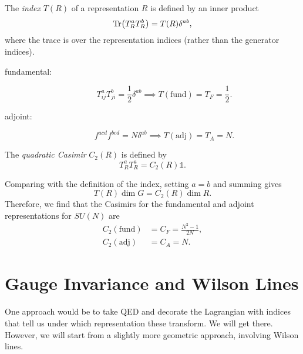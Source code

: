 \begin{definition}[index]
  The \emph{index} $T(R)$ of a representation $R$ is defined by an inner product
  \begin{equation}
    \Tr(T^{a}_R T^{b}_R) = T(R) \delta^{ab},
  \end{equation}
  where the trace is over the representation indices (rather than the generator indices).
\end{definition}
\begin{description}
  \item[fundamental:] 
  \begin{equation}
    T^{a}_{ij} T^{b}_{ji} = \frac{1}{2} \delta^{ab} \implies T(\text{fund}) = T_F = \frac{1}{2}.
  \end{equation}
\item[adjoint:] 
  \begin{equation}
    f^{acd} f^{bcd} = N \delta^{ab} \implies T(\text{adj}) = T_A = N.
  \end{equation}
\end{description}

\begin{definition}
  The \emph{quadratic Casimir} $C_2(R)$ is defined by
  \begin{equation}
    T^{a}_R T^{a}_R = C_2(R) \mathbb{1}.
  \end{equation}
\end{definition}
Comparing with the definition of the index, setting $a = b$ and summing gives
\begin{equation}
  T(R) \dim G = C_2 (R) \dim R.
\end{equation}
Therefore, we find that the Casimirs for the fundamental and adjoint representations for $SU(N)$ are
\begin{align}
  C_2 (\text{fund}) &= C_F = \frac{N^2 - 1}{2N}, \\
  C_2 (\text{adj}) &= C_A = N.
\end{align}

\section{Gauge Invariance and Wilson Lines}%
\label{sec:gauge_invariance_and_wilson_lines}

One approach would be to take QED and decorate the Lagrangian with indices that tell us under which representation these transform.
We will get there. However, we will start from a slightly more geometric approach, involving Wilson lines.

